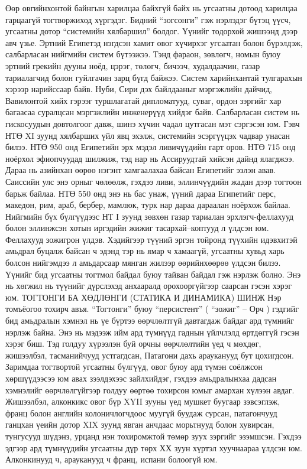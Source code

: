 Өөр овгийнхонтой байнгын харилцаа байхгүй байх нь угсаатны дотоод харилцаа гарцаагүй тогтворжиход хүргэдэг. Бидний “зогсонги” гэж нэрлэдэг бүтэц үүсч, угсаатны дотор “системийн хялбаршил” болдог. Үүнийг тодорхой жишээнд дээр авч үзье. Эртний Египетэд нэгдсэн хамит овог хүчирхэг угсаатан болон бүрэлдэж, салбарласан нийгмийн систем бүтээжээ. Тэнд фараон, зөвлөгч, номын буюу эртний грекийн дууны ноёд, цэрэг, төлөгч, бичээч, худалдаачин, газар тариалагчид болон гуйлгачин зарц бүгд байжээ. Систем харийнхантай тулгарахын хэрээр нарийссаар байв. Нуби, Сири дэх байлдааныг мэргэжлийн дайчид, Вавилонтой хийх гэрээг туршлагатай дипломатууд, суваг, ордон зэргийг хар багаасаа суралцсан мэргэжлийн инженерүүд хийдэг байв. Салбарласан систем нь гискосуудын довтолгоог давж, шинэ хүчин чадал цутгасан мэт сэргэсэн юм. Гэвч НТӨ XI зуунд хялбарших үйл явц эхэлж, системийн эсэргүүцэх чадвар унасан билээ. НТӨ 950 онд Египетийн эрх мэдэл ливичүүдийн гарт оров. НТӨ 715 онд ноёрхол эфиопчуудад шилжиж, тэд нар нь Ассируудтай хийсэн дайнд ялагджээ. Дараа нь азийнхан өөрөө нэгэнт хамгаалахаа байсан Египетийг эзлэн авав. Саиссийн улс энэ орныг чөлөөлж, гэхдээ ливи, эллинчүүдийн жадан дээр тогтоон барьж байлаа. НТӨ 550 онд энэ нь бас унаж, үүний дараа Египетийг перс, македон, рим, араб, бербер, мамлюк, турк нар дараа дараалан ноёрхож байлаа. Нийгмийн бүх бүлгүүдээс НТ I зуунд зөвхөн газар тариалан эрхлэгч-феллахууд болон эллинжсэн хотын иргэдийн жижиг тасархай–коптууд л үлдсэн юм. Феллахууд зожигрон үлдэв. Хэдийгээр түүний эргэн тойронд түүхийн идэвхитэй амьдрал буцалж байсан ч эдэнд тэр нь ямар ч хамаагүй, угсаатны хувьд харь болсон нийгэмдээ л амьдарсаар мянган жилээр өөрийнхөөрөө үлдсэн билээ. Үүнийг бид угсаатны тогтмол байдал буюу тайван байдал гэж нэрлэж болно. Энэ нь хөгжил нь түүнийг дүрслэхэд анхааралд орохооргүйгээр саарсан гэсэн хэрэг юм.
ТОГТОНГИ БА ХӨДЛӨНГИ (СТАТИКА И ДИНАМИКА) ШИНЖ
Нэр томъёогоо тохирч авъя. “Тогтонги” буюу “персистент” ( “зожиг” – Орч ) гэдгийг бид амьдралын хэмнэл нь үе бүртээ өөрчлөлтгүй давтагдаж байдаг ард түмнийг нэрлэж байна. Энэ нь мэдээж ийм ард түмнүүд гаднын үйлчлэлд өртдөггүй гэсэн хэрэг биш. Тэд голдуу хүрээлэн буй орчны өөрчлөлтийн үед ч мөхдөг, жишээлбэл, тасманийчууд устгагдсан, Патагони дахь арауканууд бут цохигдсон. Заримдаа тогтвортой угсаатны бүлгүүд, овог буюу ард түмэн соёлжсон хөршүүдээсээ юм авах зээлдэхээс зайлхийдэг, гэхдээ амьдралынхаа дадсан хэмнэлийг өөрчлөлгүйгээр голдуу өөртөө тохирсон юмыг амархан хүлээн авдаг. Жишээлбэл, алконкикс овог бүр XYII зууны үед мушкет буугаар зэвсэглэж, франц болон английн колоничлогчдоос муугүй буудаж сурсан, патагончууд ганцхан үеийн дотор XIX зуунд явган анчдаас морьтнууд болон хувирсан, тунгусууд шүдэнз, урцанд нэн тохиромжтой төмөр зуух зэргийг эзэмшсэн. Гэхдээ эдгээр ард түмнүүдийн угсаатны дүр төрх ХХ зуун хүртэл хуучнаараа үлдсэн юм. Алконкинууд ч, арауканууд ч франц, испани болоогүй юм.
